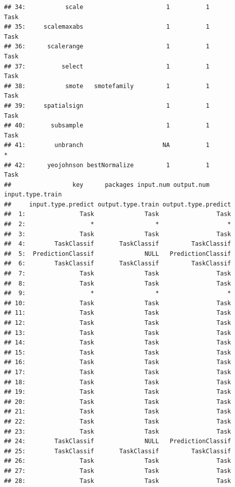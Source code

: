\documentclass[]{scrbook}
\begin{document}
\begin{verbatim}
## 34:           scale                       1          1             Task
## 35:     scalemaxabs                       1          1             Task
## 36:      scalerange                       1          1             Task
## 37:          select                       1          1             Task
## 38:           smote   smotefamily         1          1             Task
## 39:     spatialsign                       1          1             Task
## 40:       subsample                       1          1             Task
## 41:        unbranch                      NA          1                *
## 42:      yeojohnson bestNormalize         1          1             Task
##                 key      packages input.num output.num input.type.train
##     input.type.predict output.type.train output.type.predict
##  1:               Task              Task                Task
##  2:                  *                 *                   *
##  3:               Task              Task                Task
##  4:        TaskClassif       TaskClassif         TaskClassif
##  5:  PredictionClassif              NULL   PredictionClassif
##  6:        TaskClassif       TaskClassif         TaskClassif
##  7:               Task              Task                Task
##  8:               Task              Task                Task
##  9:                  *                 *                   *
## 10:               Task              Task                Task
## 11:               Task              Task                Task
## 12:               Task              Task                Task
## 13:               Task              Task                Task
## 14:               Task              Task                Task
## 15:               Task              Task                Task
## 16:               Task              Task                Task
## 17:               Task              Task                Task
## 18:               Task              Task                Task
## 19:               Task              Task                Task
## 20:               Task              Task                Task
## 21:               Task              Task                Task
## 22:               Task              Task                Task
## 23:               Task              Task                Task
## 24:        TaskClassif              NULL   PredictionClassif
## 25:        TaskClassif       TaskClassif         TaskClassif
## 26:               Task              Task                Task
## 27:               Task              Task                Task
## 28:               Task              Task                Task

\end{verbatim}
\end{document}
